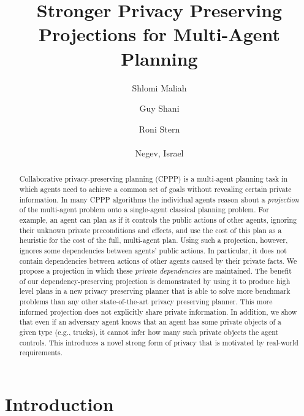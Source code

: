 \documentclass[letterpaper]{article}
\theoremstyle{definition}
\begin{document}
%
\title{Stronger Privacy Preserving Projections for Multi-Agent Planning}
\author{Shlomi Maliah \and Guy Shani \and Roni Stern\\\\
 Negev, Israel\\
}
\maketitle
\begin{abstract}
Collaborative privacy-preserving planning (CPPP) is a multi-agent planning task in which agents need to achieve a common set of goals without revealing certain private information. In many CPPP algorithms the individual agents reason about a {\em projection} of the multi-agent problem onto a single-agent classical planning problem.
For example, an agent can plan as if it controls the public actions of other agents, ignoring their unknown private preconditions and effects, and use the cost of this plan as a heuristic for the cost of the full, multi-agent plan. Using such a projection, however, ignores some dependencies between agents' public actions. In particular, it does not contain dependencies between actions  of other agents caused by their private facts. We propose a projection in which these {\em private dependencies} are maintained.
The benefit of our dependency-preserving projection is demonstrated by using it to produce high level plans in a new privacy preserving planner that is able to solve more benchmark problems than any other state-of-the-art privacy preserving planner.
This more informed projection does not explicitly share private information. In addition, we show that even if an adversary agent knows that an agent has some private objects of a given type (e.g., trucks), it cannot infer how many such private objects the agent controls. This introduces a novel strong form of privacy that is motivated by real-world requirements.
\end{abstract}
\section{Introduction}


\end{document}
